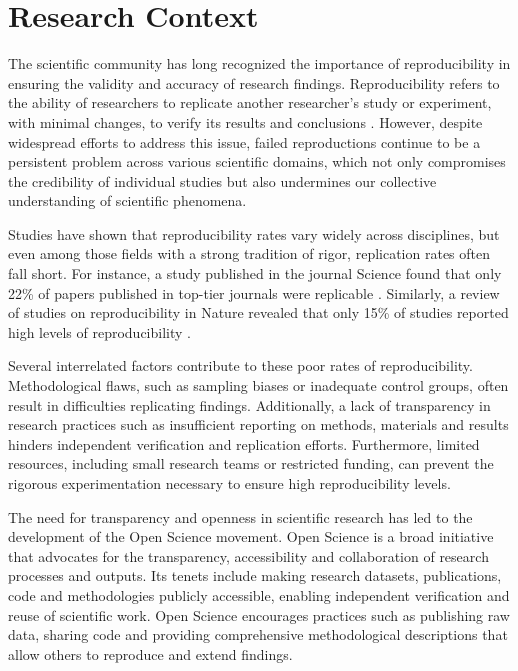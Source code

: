 \documentclass{article}
\begin{document}
\section{Research Context}

The scientific community has long recognized the importance of reproducibility in ensuring the validity and accuracy of research findings. Reproducibility refers to the ability of researchers to replicate another researcher's study or experiment, with minimal changes, to verify its results and conclusions \cite{vasilevsky_reproducibility_2013}. However, despite widespread efforts to address this issue, failed reproductions continue to be a persistent problem across various scientific domains, which not only compromises the credibility of individual studies but also undermines our collective understanding of scientific phenomena.

Studies have shown that reproducibility rates vary widely across disciplines, but even among those fields with a strong tradition of rigor, replication rates often fall short. For instance, a study published in the journal Science found that only 22\% of papers published in top-tier journals were replicable \cite{freedman_economics_2015}. Similarly, a review of studies on reproducibility in Nature revealed that only 15\% of studies reported high levels of reproducibility \cite{begley_reproducibility_2015}.

Several interrelated factors contribute to these poor rates of reproducibility. Methodological flaws, such as sampling biases or inadequate control groups, often result in difficulties replicating findings. Additionally, a lack of transparency in research practices such as insufficient reporting on methods, materials and results hinders independent verification and replication efforts. Furthermore, limited resources, including small research teams or restricted funding, can prevent the rigorous experimentation necessary to ensure high reproducibility levels.

The need for transparency and openness in scientific research has led to the development of the Open Science movement. Open Science is a broad initiative that advocates for the transparency, accessibility and collaboration of research processes and outputs. Its tenets include making research datasets, publications, code and methodologies publicly accessible, enabling independent verification and reuse of scientific work. Open Science encourages practices such as publishing raw data, sharing code and providing comprehensive methodological descriptions that allow others to reproduce and extend findings.
\end{document}
